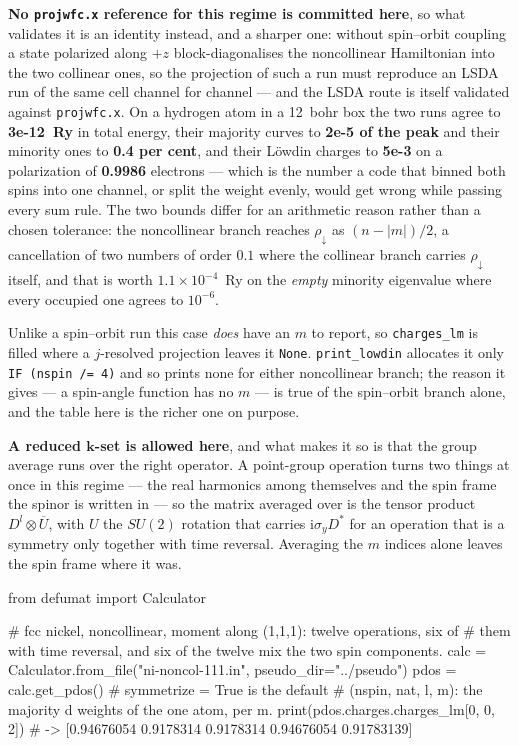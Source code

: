 \documentclass[11pt,a4paper]{article}
\newcommand{\code}[1]{\texttt{\small #1}}
\begin{document}
\textbf{No \code{projwfc.x} reference for this regime is committed here}, so
what validates it is an identity instead, and a sharper one: without spin--orbit
coupling a state polarized along $+z$ block-diagonalises the noncollinear
Hamiltonian into the two collinear ones, so the projection of such a run must
reproduce an LSDA run of the same cell channel for channel --- and the LSDA
route is itself validated against \code{projwfc.x}. On a hydrogen atom in a 12~bohr box the two
runs agree to \textbf{3e-12~Ry} in total energy, their majority curves to
\textbf{2e-5 of the peak} and their minority ones to \textbf{0.4 per cent}, and
their Löwdin charges to \textbf{5e-3} on a polarization of \textbf{0.9986}
electrons --- which is the number a code that binned both spins into one channel,
or split the weight evenly, would get wrong while passing every sum rule. The two
bounds differ for an arithmetic reason rather than a chosen tolerance: the
noncollinear branch reaches $\rho_\downarrow$ as $(n - |m|)/2$, a cancellation of
two numbers of order $0.1$ where the collinear branch carries $\rho_\downarrow$
itself, and that is worth $1.1\times10^{-4}$~Ry on the \emph{empty} minority
eigenvalue where every occupied one agrees to $10^{-6}$.

Unlike a spin--orbit run this case \emph{does} have an $m$ to report, so
\code{charges\_lm} is filled where a $j$-resolved projection leaves it
\code{None}. \code{print\_lowdin} allocates it only \code{IF (nspin /= 4)} and
so prints none for either noncollinear branch; the reason it gives --- a
spin-angle function has no $m$ --- is true of the spin--orbit branch alone, and
the table here is the richer one on purpose.

\textbf{A reduced $\mathbf k$-set is allowed here}, and what makes it so is that
the group average runs over the right operator. A point-group operation turns
two things at once in this regime --- the real harmonics among themselves and
the spin frame the spinor is written in --- so the matrix averaged over is the
tensor product $D^l \otimes \overline{U}$, with $U$ the $SU(2)$ rotation that
carries $\mathrm i \sigma_y D^{*}$ for an operation that is a symmetry only
together with time reversal. Averaging the $m$ indices alone leaves the spin
frame where it was.

\begin{pycode}
from defumat import Calculator

# fcc nickel, noncollinear, moment along (1,1,1): twelve operations, six of
# them with time reversal, and six of the twelve mix the two spin components.
calc = Calculator.from_file("ni-noncol-111.in", pseudo_dir="../pseudo")
pdos = calc.get_pdos()                   # symmetrize = True is the default
# (nspin, nat, l, m): the majority d weights of the one atom, per m.
print(pdos.charges.charges_lm[0, 0, 2])
# -> [0.94676054 0.9178314  0.9178314  0.94676054 0.91783139]
\end{pycode}
\end{document}
